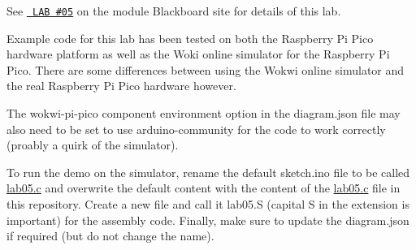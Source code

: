 See \href{https://tcd.blackboard.com/webapps/assignment/uploadAssignment?content_id=_2128951_1&course_id=_71874_1&group_id=&mode=cpview}{\texttt{ LAB \#05}} on the module Blackboard site for details of this lab.

Example code for this lab has been tested on both the Raspberry Pi Pico hardware platform as well as the Woki online simulator for the Raspberry Pi Pico. There are some differences between using the Wokwi online simulator and the real Raspberry Pi Pico hardware however.

The {\ttfamily wokwi-\/pi-\/pico} component environment option in the {\ttfamily diagram.\+json} file may also need to be set to use {\ttfamily arduino-\/community} for the code to work correctly (proably a quirk of the simulator).

To run the demo on the simulator, rename the default {\ttfamily sketch.\+ino} file to be called {\ttfamily \mbox{\hyperlink{lab05_8c}{lab05.\+c}}} and overwrite the default content with the content of the {\ttfamily \mbox{\hyperlink{lab05_8c}{lab05.\+c}}} file in this repository. Create a new file and call it {\ttfamily lab05.\+S} (capital S in the extension is important) for the assembly code. Finally, make sure to update the {\ttfamily diagram.\+json} if required (but do not change the name). 